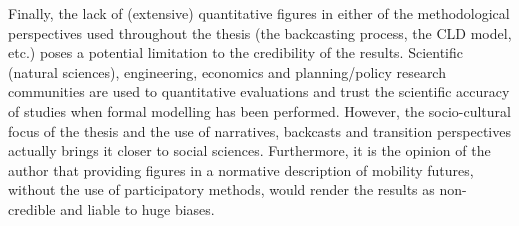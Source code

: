 Finally, the lack of (extensive) quantitative figures in either of the methodological perspectives used throughout the thesis (the backcasting process, the CLD model, etc.) poses a potential limitation to the credibility of the results. Scientific (natural sciences), engineering, economics and planning/policy research communities are used to quantitative evaluations and trust the scientific accuracy of studies when formal modelling has been performed. However, the socio-cultural focus of the thesis and the use of narratives, backcasts and transition perspectives actually brings it closer to social sciences. Furthermore, it is the opinion of the author that providing figures in a normative description of mobility futures, without the use of participatory methods, would render the results as non-credible and liable to huge biases.